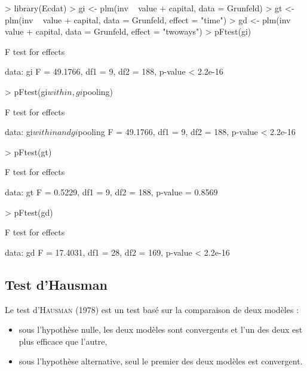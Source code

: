 \documentclass[a4paper]{article}
\begin{document}
\begin{Schunk}
\begin{Sinput}
> library(Ecdat)
> gi <- plm(inv ~ value + capital, data = Grunfeld)
> gt <- plm(inv ~ value + capital, data = Grunfeld, effect = "time")
> gd <- plm(inv ~ value + capital, data = Grunfeld, effect = "twoways")
> pFtest(gi)
\end{Sinput}
\begin{Soutput}
	F test for effects

data:  gi 
F = 49.1766, df1 = 9, df2 = 188, p-value < 2.2e-16
\end{Soutput}
\begin{Sinput}
> pFtest(gi$within, gi$pooling)
\end{Sinput}
\begin{Soutput}
	F test for effects

data:  gi$within and gi$pooling 
F = 49.1766, df1 = 9, df2 = 188, p-value < 2.2e-16
\end{Soutput}
\begin{Sinput}
> pFtest(gt)
\end{Sinput}
\begin{Soutput}
	F test for effects

data:  gt 
F = 0.5229, df1 = 9, df2 = 188, p-value = 0.8569
\end{Soutput}
\begin{Sinput}
> pFtest(gd)
\end{Sinput}
\begin{Soutput}
	F test for effects

data:  gd 
F = 17.4031, df1 = 28, df2 = 169, p-value < 2.2e-16
\end{Soutput}
\end{Schunk}



\subsection{Test d'Hausman}

Le test d'\textsc{Hausman} (1978) est un test basé sur la comparaison de deux
modèles :

\begin{itemize}
\item sous l'hypothèse nulle, les deux modèles sont convergents et
  l'un des deux est plus efficace que l'autre,
\item sous l'hypothèse alternative, seul le premier des deux modèles
  est convergent.
\end{itemize}
\end{document}
